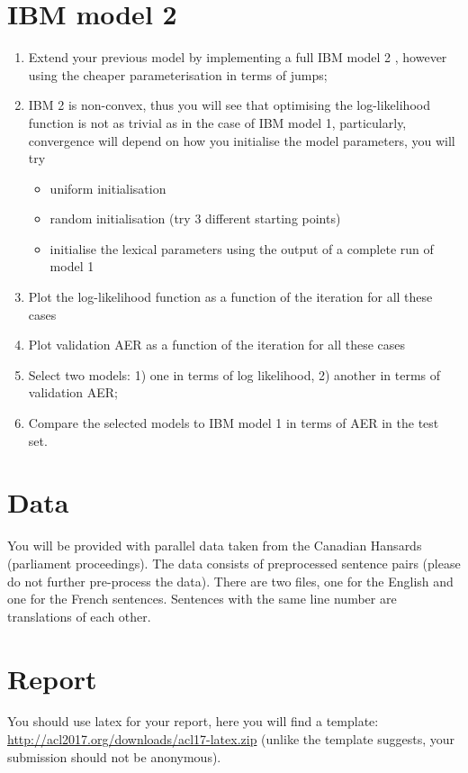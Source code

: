 \section{IBM model 2}

\begin{enumerate}
  \item Extend your previous model by implementing a full IBM model 2 \citep{Brown+1993:smt}, however using the cheaper parameterisation in terms of jumps;
  \item IBM 2 is non-convex, thus you will see that optimising the log-likelihood function is 
        not as trivial as in the case of IBM model 1, particularly, convergence will depend 
        on how you initialise the model parameters, you will try
  \begin{itemize}
    \item uniform initialisation
    \item random initialisation (try 3 different starting points)
    \item initialise the lexical parameters using the output of a complete run of model 1
  \end{itemize}
  \item Plot the log-likelihood function as a function of the iteration for all these cases
  \item Plot validation AER as a function of the iteration for all these cases
  \item Select two models: 1) one in terms of log likelihood, 2) another in terms of validation AER;
  \item Compare the selected models to IBM model 1 in terms of AER in the test set.
\end{enumerate}

\section{Data}
You will be provided with parallel data taken from the Canadian Hansards (parliament proceedings). 
The data consists
of preprocessed sentence pairs (please do not further pre-process the data). There are two files, one for the
English and one for the French sentences. Sentences with the same line number are translations of each other.


\section{Report}

You should use latex for your report, here you will find a template: \url{http://acl2017.org/downloads/acl17-latex.zip} (unlike the template suggests, your submission should not be anonymous). 

